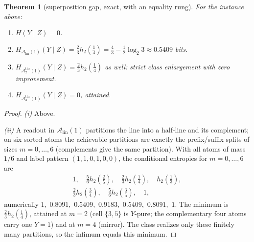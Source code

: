 \documentclass[twocolumn,10pt]{article}
\newtheorem{theorem}{Theorem}[section]
\theoremstyle{definition}
\theoremstyle{remark}
\newcommand{\cA}{\mathcal{A}}
\newcommand{\Alin}{\cA_{\mathrm{lin}}}
\newcommand{\Athr}[1]{\cA^{\mathrm{thr}}_{#1}}
\newcommand{\hb}{h_2}
\begin{document}
\begin{theorem}[superposition gap, exact, with an equality rung]
\label{thm:superposition}
For the instance above:
\begin{enumerate}
\item[(i)] $H(Y \mid Z) = 0$.
\item[(ii)] $H_{\Alin(1)}(Y \mid Z) = \tfrac23 \hb(\tfrac14)
= \tfrac43 - \tfrac12 \log_2 3 \approx 0.5409$ bits.
\item[(iii)] $H_{\Athr{2}(1)}(Y \mid Z) = \tfrac23 \hb(\tfrac14)$ as well:
strict class enlargement with zero improvement.
\item[(iv)] $H_{\Athr{3}(1)}(Y \mid Z) = 0$, attained.
\end{enumerate}
\end{theorem}

\begin{proof}
\emph{(i)} Above.

\emph{(ii)} A readout in $\Alin(1)$ partitions the line into a half-line
and its complement; on six sorted atoms the achievable partitions are
exactly the prefix/suffix splits of sizes $m = 0, \dots, 6$ (complements
give the same partition). With all atoms of mass $1/6$ and label pattern
$(1,1,0,1,0,0)$, the conditional entropies for $m = 0, \dots, 6$ are
\begin{multline*}
1,\quad \tfrac56 \hb(\tfrac25),\quad \tfrac23 \hb(\tfrac14),\quad
\hb(\tfrac13), \\
\tfrac23 \hb(\tfrac34),\quad \tfrac56 \hb(\tfrac35),
\quad 1,
\end{multline*}
numerically $1$,\ $0.8091$,\ $\mathbf{0.5409}$,\ $0.9183$,\
$\mathbf{0.5409}$,\ $0.8091$,\ $1$. The minimum is $\tfrac23 \hb(\tfrac14)$, attained at $m = 2$
(cell $\{3, 5\}$ is $Y$-pure; the complementary four atoms carry one
$Y{=}1$) and at $m = 4$ (mirror). The class realizes only these finitely
many partitions, so the infimum equals this minimum.


\end{proof}
\end{document}
